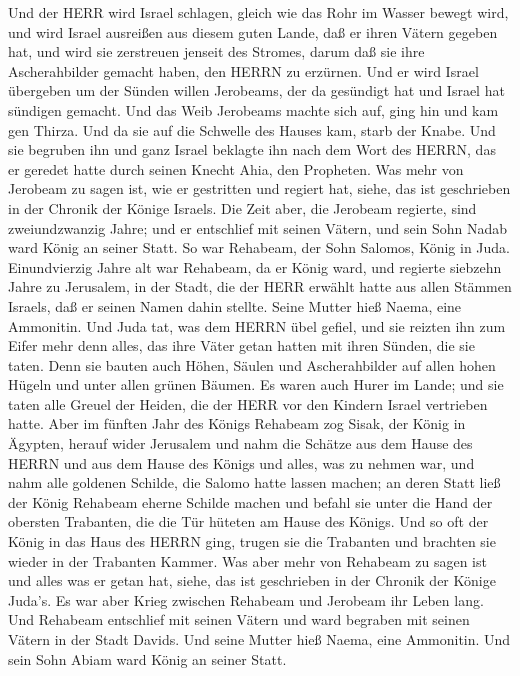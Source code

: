  Und der HERR wird Israel schlagen, gleich wie das Rohr im
Wasser bewegt wird, und wird Israel ausreißen aus diesem guten Lande,
daß er ihren Vätern gegeben hat, und wird sie zerstreuen jenseit des
Stromes, darum daß sie ihre Ascherahbilder gemacht haben, den HERRN zu
erzürnen.  Und er wird Israel übergeben um der Sünden
willen Jerobeams, der da gesündigt hat und Israel hat sündigen gemacht.
 Und das Weib Jerobeams machte sich auf, ging hin und kam
gen Thirza. Und da sie auf die Schwelle des Hauses kam, starb der Knabe.
 Und sie begruben ihn und ganz Israel beklagte ihn nach dem
Wort des HERRN, das er geredet hatte durch seinen Knecht Ahia, den
Propheten.  Was mehr von Jerobeam zu sagen ist, wie er
gestritten und regiert hat, siehe, das ist geschrieben in der Chronik
der Könige Israels.  Die Zeit aber, die Jerobeam regierte,
sind zweiundzwanzig Jahre; und er entschlief mit seinen Vätern, und sein
Sohn Nadab ward König an seiner Statt.  So war Rehabeam,
der Sohn Salomos, König in Juda. Einundvierzig Jahre alt war Rehabeam,
da er König ward, und regierte siebzehn Jahre zu Jerusalem, in der
Stadt, die der HERR erwählt hatte aus allen Stämmen Israels, daß er
seinen Namen dahin stellte. Seine Mutter hieß Naema, eine Ammonitin.
 Und Juda tat, was dem HERRN übel gefiel, und sie reizten
ihn zum Eifer mehr denn alles, das ihre Väter getan hatten mit ihren
Sünden, die sie taten.  Denn sie bauten auch Höhen, Säulen
und Ascherahbilder auf allen hohen Hügeln und unter allen grünen Bäumen.
 Es waren auch Hurer im Lande; und sie taten alle Greuel
der Heiden, die der HERR vor den Kindern Israel vertrieben hatte.
 Aber im fünften Jahr des Königs Rehabeam zog Sisak, der
König in Ägypten, herauf wider Jerusalem  und nahm die
Schätze aus dem Hause des HERRN und aus dem Hause des Königs und alles,
was zu nehmen war, und nahm alle goldenen Schilde, die Salomo hatte
lassen machen;  an deren Statt ließ der König Rehabeam
eherne Schilde machen und befahl sie unter die Hand der obersten
Trabanten, die die Tür hüteten am Hause des Königs.  Und so
oft der König in das Haus des HERRN ging, trugen sie die Trabanten und
brachten sie wieder in der Trabanten Kammer.  Was aber mehr
von Rehabeam zu sagen ist und alles was er getan hat, siehe, das ist
geschrieben in der Chronik der Könige Juda's.  Es war aber
Krieg zwischen Rehabeam und Jerobeam ihr Leben lang.  Und
Rehabeam entschlief mit seinen Vätern und ward begraben mit seinen
Vätern in der Stadt Davids. Und seine Mutter hieß Naema, eine Ammonitin.
Und sein Sohn Abiam ward König an seiner Statt.

